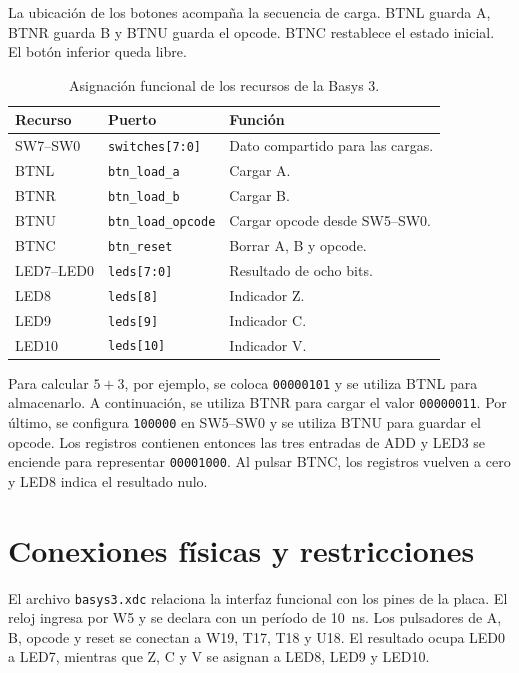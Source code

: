 La ubicación de los botones acompaña la secuencia de carga. BTNL
guarda A, BTNR guarda B y BTNU guarda el opcode. BTNC restablece el
estado inicial. El botón inferior queda libre.

\begin{table}[H]
  \centering
  \begin{tabularx}{\textwidth}{L{3.0cm}L{3.5cm}Y}
    \toprule
    \textbf{Recurso} & \textbf{Puerto} & \textbf{Función} \\
    \midrule
    SW7--SW0 & \texttt{switches[7:0]} & Dato compartido para las cargas. \\
    BTNL & \texttt{btn\_load\_a} & Cargar A. \\
    BTNR & \texttt{btn\_load\_b} & Cargar B. \\
    BTNU & \texttt{btn\_load\_opcode} & Cargar opcode desde SW5--SW0. \\
    BTNC & \texttt{btn\_reset} & Borrar A, B y opcode. \\
    LED7--LED0 & \texttt{leds[7:0]} & Resultado de ocho bits. \\
    LED8 & \texttt{leds[8]} & Indicador Z. \\
    LED9 & \texttt{leds[9]} & Indicador C. \\
    LED10 & \texttt{leds[10]} & Indicador V. \\
    \bottomrule
  \end{tabularx}
  \caption{Asignación funcional de los recursos de la Basys 3.}
\end{table}

Para calcular $5+3$, por ejemplo, se coloca \texttt{00000101} y se
utiliza BTNL para almacenarlo. A continuación, se utiliza BTNR para
cargar el valor \texttt{00000011}. Por último, se configura
\texttt{100000} en SW5--SW0 y se utiliza BTNU para guardar el opcode.
Los registros contienen entonces las tres entradas de ADD y LED3 se
enciende para representar \texttt{00001000}. Al pulsar BTNC, los
registros vuelven a cero y LED8 indica el resultado nulo.

\section{Conexiones físicas y restricciones}

El archivo \texttt{basys3.xdc} relaciona la interfaz funcional con
los pines de la placa. El reloj ingresa por W5 y se declara con un
período de \SI{10}{\nano\second}. Los pulsadores de A, B, opcode y
reset se conectan a W19, T17, T18 y U18. El resultado ocupa LED0 a
LED7, mientras que Z, C y V se asignan a LED8, LED9 y LED10.


